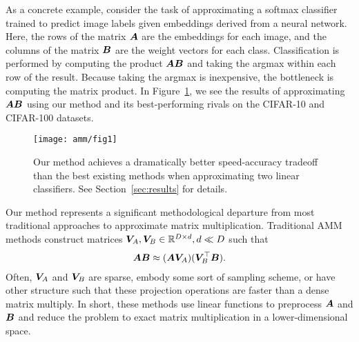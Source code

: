 As a concrete example, consider the task of approximating a softmax classifier trained to predict image labels given embeddings derived from a neural network. Here, the rows of the matrix $\bm{A}$ are the embeddings for each image, and the columns of the matrix $\bm{B}$ are the weight vectors for each class. Classification is performed by computing the product $\bm{A}\bm{B}$ and taking the argmax within each row of the result. Because taking the argmax is inexpensive, the bottleneck is computing the matrix product.
In Figure~\ref{fig:fig1}, we see the results of approximating $\bm{A}\bm{B}$ using our method and its best-performing rivals \cite{hashjl, sparsePCA} on the CIFAR-10 and CIFAR-100 datasets.%
\vspace{1mm}
\begin{figure}[h]
\begin{center}
\texttt{[image: amm/fig1]}
\caption{Our method achieves a dramatically better speed-accuracy tradeoff than the best existing methods when approximating two linear classifiers. See Section~\ref{sec:results} for details.}
\label{fig:fig1}
\end{center}
\end{figure}
\vspace{-1.5mm}

Our method represents a significant methodological departure from most traditional approaches to
approximate matrix multiplication.
Traditional AMM methods construct matrices $\bm{V}_A, \bm{V}_B \in \mathbb{R}^{D \times d}, d \ll D$ such that
\begin{align}
    \bm{A} \bm{B} \approx (\bm{A} \bm{V}_A) (\bm{V}_B^\top \bm{B}).
\end{align}
Often, $\bm{V}_A$ and $\bm{V}_B$ are sparse, embody some sort of sampling scheme, or have other structure such that these projection operations are faster than a dense matrix multiply. In short, these methods use linear functions to preprocess $\bm{A}$ and $\bm{B}$ and reduce the problem to exact matrix multiplication in a lower-dimensional space.

